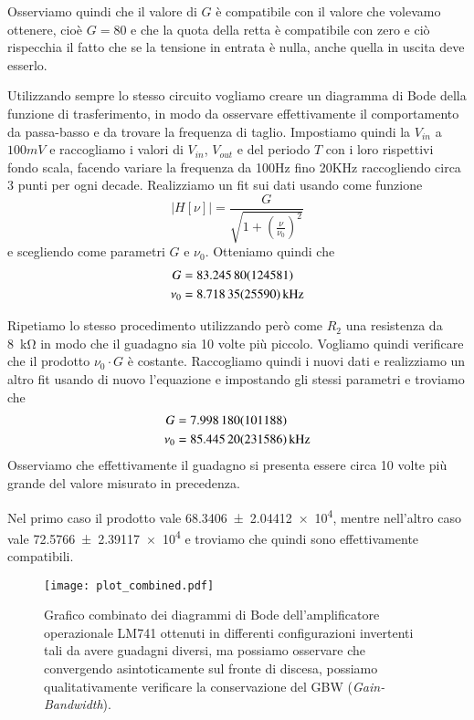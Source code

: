 \documentclass[
    rmp,
    reprint, 
    superscriptaddress, 
    altaffilletter, 
    amsmath, 
    amssymb,
    a4paper]{revtex4-2}
\begin{document}
Osserviamo quindi che il valore di $G$ è compatibile con il valore che volevamo ottenere, cioè $G=80$ e che la quota della retta è compatibile con zero e ciò rispecchia il fatto che se la tensione in entrata è nulla, anche quella in uscita deve esserlo.

Utilizzando sempre lo stesso circuito vogliamo creare un diagramma di Bode della funzione di trasferimento, in modo da osservare effettivamente il comportamento da passa-basso e da trovare la frequenza di taglio. Impostiamo quindi la $V_{in}$ a $100mV$ e raccogliamo i valori di $V_{in}$, $V_{out}$ e del periodo $T$ con i loro rispettivi fondo scala, facendo variare la frequenza da 100Hz fino 20KHz raccogliendo circa 3 punti per ogni decade. Realizziamo un fit sui dati usando come funzione  \begin{equation}\left|H[\nu]\right|=\frac{G}{\sqrt{1+\left(\frac{\nu}{\nu_0}\right)^2}} \label{eq:H}\end{equation} e scegliendo come parametri $G$ e $\nu_0$. 
Otteniamo quindi che
\begin{align*}
    G     &=\num{ 83.2458 +- 1.24581} \\
    \nu_0 &=\SI{8.71835 +- 0.2559}{\kilo\hertz} \\ 
\end{align*}

Ripetiamo lo stesso procedimento utilizzando però come $R_2$ una resistenza da \SI{8}{\kilo\ohm} in modo che il guadagno sia 10 volte più piccolo. Vogliamo quindi verificare che il prodotto $\nu_0 \cdot G $ è costante. Raccogliamo quindi i nuovi dati e realizziamo un altro fit usando di nuovo l'equazione  e impostando gli stessi parametri e troviamo che
\begin{align*}
    G     &=\num{7.99818 +- 0.101188} \\
    \nu_0 &=\SI{85.4452 +- 2.31586}{\kilo\hertz} \\ 
\end{align*}
Osserviamo che effettivamente il guadagno si presenta essere circa 10 volte più grande del valore misurato in precedenza.

Nel primo caso il prodotto vale \num{68.3406 +- 2.04412e4}, mentre nell'altro caso vale \num{72.5766 +- 2.39117e4} e troviamo che quindi sono effettivamente compatibili.

\begin{figure}
    \texttt{[image: plot\_combined.pdf]}
    \caption{Grafico combinato dei diagrammi di Bode dell'amplificatore operazionale LM741 ottenuti in differenti configurazioni invertenti tali da avere guadagni diversi, ma possiamo osservare che convergendo asintoticamente sul fronte di discesa, possiamo qualitativamente verificare la conservazione del GBW (\emph{Gain-Bandwidth}).}
    \label{fig:plot_combined}
\end{figure}
\end{document}
